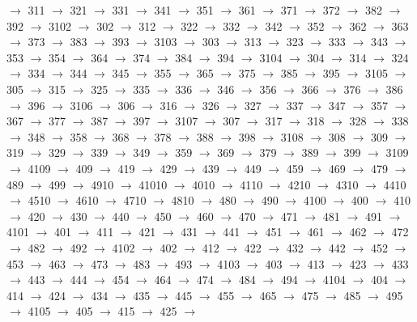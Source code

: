 $\rightarrow$ 311 $\rightarrow$ 321 $\rightarrow$ 331 $\rightarrow$ 341 $\rightarrow$ 351 $\rightarrow$ 361 $\rightarrow$ 371 $\rightarrow$ 372 $\rightarrow$ 382 $\rightarrow$ 392 $\rightarrow$ 3102 $\rightarrow$ 302 $\rightarrow$ 312 $\rightarrow$ 322 $\rightarrow$ 332 $\rightarrow$ 342 $\rightarrow$ 352 $\rightarrow$ 362 $\rightarrow$ 363 $\rightarrow$ 373 $\rightarrow$ 383 $\rightarrow$ 393 $\rightarrow$ 3103 $\rightarrow$ 303 $\rightarrow$ 313 $\rightarrow$ 323 $\rightarrow$ 333 $\rightarrow$ 343 $\rightarrow$ 353 $\rightarrow$ 354 $\rightarrow$ 364 $\rightarrow$ 374 $\rightarrow$ 384 $\rightarrow$ 394 $\rightarrow$ 3104 $\rightarrow$ 304 $\rightarrow$ 314 $\rightarrow$ 324 $\rightarrow$ 334 $\rightarrow$ 344 $\rightarrow$ 345 $\rightarrow$ 355 $\rightarrow$ 365 $\rightarrow$ 375 $\rightarrow$ 385 $\rightarrow$ 395 $\rightarrow$ 3105 $\rightarrow$ 305 $\rightarrow$ 315 $\rightarrow$ 325 $\rightarrow$ 335 $\rightarrow$ 336 $\rightarrow$ 346 $\rightarrow$ 356 $\rightarrow$ 366 $\rightarrow$ 376 $\rightarrow$ 386 $\rightarrow$ 396 $\rightarrow$ 3106 $\rightarrow$ 306 $\rightarrow$ 316 $\rightarrow$ 326 $\rightarrow$ 327 $\rightarrow$ 337 $\rightarrow$ 347 $\rightarrow$ 357 $\rightarrow$ 367 $\rightarrow$ 377 $\rightarrow$ 387 $\rightarrow$ 397 $\rightarrow$ 3107 $\rightarrow$ 307 $\rightarrow$ 317 $\rightarrow$ 318 $\rightarrow$ 328 $\rightarrow$ 338 $\rightarrow$ 348 $\rightarrow$ 358 $\rightarrow$ 368 $\rightarrow$ 378 $\rightarrow$ 388 $\rightarrow$ 398 $\rightarrow$ 3108 $\rightarrow$ 308 $\rightarrow$ 309 $\rightarrow$ 319 $\rightarrow$ 329 $\rightarrow$ 339 $\rightarrow$ 349 $\rightarrow$ 359 $\rightarrow$ 369 $\rightarrow$ 379 $\rightarrow$ 389 $\rightarrow$ 399 $\rightarrow$ 3109 $\rightarrow$ 4109 $\rightarrow$ 409 $\rightarrow$ 419 $\rightarrow$ 429 $\rightarrow$ 439 $\rightarrow$ 449 $\rightarrow$ 459 $\rightarrow$ 469 $\rightarrow$ 479 $\rightarrow$ 489 $\rightarrow$ 499 $\rightarrow$ 4910 $\rightarrow$ 41010 $\rightarrow$ 4010 $\rightarrow$ 4110 $\rightarrow$ 4210 $\rightarrow$ 4310 $\rightarrow$ 4410 $\rightarrow$ 4510 $\rightarrow$ 4610 $\rightarrow$ 4710 $\rightarrow$ 4810 $\rightarrow$ 480 $\rightarrow$ 490 $\rightarrow$ 4100 $\rightarrow$ 400 $\rightarrow$ 410 $\rightarrow$ 420 $\rightarrow$ 430 $\rightarrow$ 440 $\rightarrow$ 450 $\rightarrow$ 460 $\rightarrow$ 470 $\rightarrow$ 471 $\rightarrow$ 481 $\rightarrow$ 491 $\rightarrow$ 4101 $\rightarrow$ 401 $\rightarrow$ 411 $\rightarrow$ 421 $\rightarrow$ 431 $\rightarrow$ 441 $\rightarrow$ 451 $\rightarrow$ 461 $\rightarrow$ 462 $\rightarrow$ 472 $\rightarrow$ 482 $\rightarrow$ 492 $\rightarrow$ 4102 $\rightarrow$ 402 $\rightarrow$ 412 $\rightarrow$ 422 $\rightarrow$ 432 $\rightarrow$ 442 $\rightarrow$ 452 $\rightarrow$ 453 $\rightarrow$ 463 $\rightarrow$ 473 $\rightarrow$ 483 $\rightarrow$ 493 $\rightarrow$ 4103 $\rightarrow$ 403 $\rightarrow$ 413 $\rightarrow$ 423 $\rightarrow$ 433 $\rightarrow$ 443 $\rightarrow$ 444 $\rightarrow$ 454 $\rightarrow$ 464 $\rightarrow$ 474 $\rightarrow$ 484 $\rightarrow$ 494 $\rightarrow$ 4104 $\rightarrow$ 404 $\rightarrow$ 414 $\rightarrow$ 424 $\rightarrow$ 434 $\rightarrow$ 435 $\rightarrow$ 445 $\rightarrow$ 455 $\rightarrow$ 465 $\rightarrow$ 475 $\rightarrow$ 485 $\rightarrow$ 495 $\rightarrow$ 4105 $\rightarrow$ 405 $\rightarrow$ 415 $\rightarrow$ 425 $\rightarrow$ 